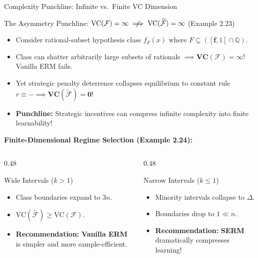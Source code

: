 \documentclass[aspectratio=169, 11pt, t, xcolor=table]{beamer}
\newcommand{\cg}[1]{\mathcal{#1}}
\newcommand{\minus}{\mathbf{-}}
\begin{document}
\begin{frame}{Complexity Punchline: Infinite vs.\ Finite VC Dimension}
\small
\begin{alertblock}{The Asymmetry Punchline: $\text{VC}(\cg{F}) = \infty \centernot\implies \text{VC}(\widetilde{\cg{F}}) = \infty$ (Example 2.23)}
\footnotesize
\begin{itemize}\itemsep=1pt
  \item Consider rational-subset hypothesis class $f_F(x)$ where $F \subseteq ([\mathbf{f}, 1] \cap \mathbb{Q})$.
  \item Class can shatter arbitrarily large subsets of rationals $\implies \mathbf{\text{VC}(\cg{F}) = \infty}$! Vanilla ERM fails.
  \item Yet strategic penalty deterrence collapses equilibrium to constant rule $r \equiv \minus \implies \mathbf{\text{VC}(\widetilde{\cg{F}}) = 0}$!
  \item \textbf{Punchline:} Strategic incentives can compress infinite complexity into finite learnability!
\end{itemize}
\end{alertblock}

\vspace{0.15em}
\textbf{Finite-Dimensional Regime Selection (Example 2.24):}
\begin{columns}[T,onlytextwidth]
\begin{column}{0.48\textwidth}
\begin{exampleblock}{Wide Intervals ($k > 1$)}
\footnotesize
\begin{itemize}\itemsep=0.5pt
  \item Class boundaries expand to $3n$.
  \item $\text{VC}(\widetilde{\cg{F}}) \ge \text{VC}(\cg{F})$.
  \item \textbf{Recommendation:} \textbf{Vanilla ERM} is simpler and more sample-efficient.
\end{itemize}
\end{exampleblock}
\end{column}
\begin{column}{0.48\textwidth}
\begin{exampleblock}{Narrow Intervals ($k \le 1$)}
\footnotesize
\begin{itemize}\itemsep=0.5pt
  \item Minority intervals collapse to $\Delta$.
  \item Boundaries drop to $1 \ll n$.
  \item \textbf{Recommendation:} \textbf{SERM} dramatically compresses learning!
\end{itemize}
\end{exampleblock}
\end{column}
\end{columns}
\end{frame}
\end{document}
